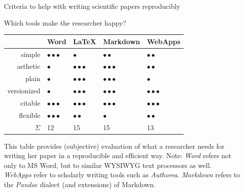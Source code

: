\documentclass[final,hyperref={pdfpagelabels=false}]{beamer}
\begin{document}
\begin{frame}{}
\begin{columns}[t]
\begin{column}{.48\linewidth}
\begin{block}{Criteria to help with writing scientific papers reproducibly}
\begin{itemize}
	
       \end{itemize}
        \end{block}



   
     \begin{block}{Which tools make the researcher happy?}
    \begin{center}
\begin{tabular}{rllll}
  \hline
 & Word & \LaTeX & Markdown & WebApps \\ 
  \hline
simple &  $\bullet\bullet\bullet$ & $\bullet$ & $\bullet\bullet$ & $\bullet\bullet$ \\ 
  asthetic & $\bullet$ & $\bullet\bullet\bullet$ & $\bullet\bullet\bullet$ &  $\bullet\bullet$ \\ 
  plain & $\bullet$ & $\bullet\bullet\bullet$ & $\bullet\bullet\bullet$ & $\bullet$ \\ 
  versionized & $\bullet$ & $\bullet\bullet\bullet$ & $\bullet\bullet\bullet$ & $\bullet\bullet\bullet$ \\ 
  citable & $\bullet\bullet\bullet$ & $\bullet\bullet\bullet$ & $\bullet\bullet\bullet$ & $\bullet\bullet\bullet$ \\ 
  flexible & $\bullet\bullet\bullet$ &  $\bullet\bullet$ & $\bullet$ &  $\bullet\bullet$ \\ 
   \hline
   $\Sigma$ & 12 & 15 & 15 & 13\\
   \hline
\end{tabular}
\end{center}
\bigskip

This table provides (subjective) evaluation of what a researcher needs for writing her paper in a reproducible and efficient way. Note: \emph{Word} refers not only to MS Word, but to similar WYSIWYG text processors as well. \emph{WebApps} refer to scholarly writing tools such as \emph{Authorea}. \emph{Markdown} refers to the \emph{Pandoc} dialect (and extensions) of Markdown.
   
        \end{block}
 
      
      \end{column}
      
            
      
      \begin{column}{.48\linewidth} 
          

\end{column}
\end{columns}
\end{frame}
\end{document}
